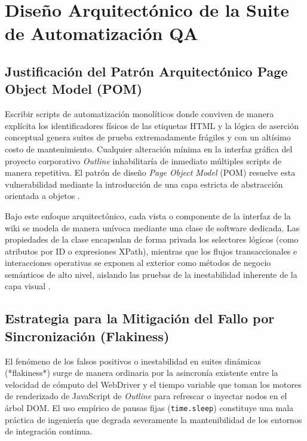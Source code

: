 \documentclass[12pt,oneside]{report}
\begin{document}
\chapter{Diseño Arquitectónico de la Suite de Automatización QA}

\section{Justificación del Patrón Arquitectónico Page Object Model (POM)}
Escribir scripts de automatización monolíticos donde conviven de manera explícita los identificadores físicos de las etiquetas HTML y la lógica de aserción conceptual genera suites de prueba extremadamente frágiles y con un altísimo costo de mantenimiento. Cualquier alteración mínima en la interfaz gráfica del proyecto corporativo \textit{Outline} inhabilitaría de inmediato múltiples scripts de manera repetitiva. El patrón de diseño \textit{Page Object Model} (POM) resuelve esta vulnerabilidad mediante la introducción de una capa estricta de abstracción orientada a objetos \parencite{jorgensen2022}.

Bajo este enfoque arquitectónico, cada vista o componente de la interfaz de la wiki se modela de manera unívoca mediante una clase de software dedicada. Las propiedades de la clase encapsulan de forma privada los selectores lógicos (como atributos por ID o expresiones XPath), mientras que los flujos transaccionales e interacciones operativas se exponen al exterior como métodos de negocio semánticos de alto nivel, aislando las pruebas de la inestabilidad inherente de la capa visual \parencite{pressman2014}.

\section{Estrategia para la Mitigación del Fallo por Sincronización (Flakiness)}
El fenómeno de los falsos positivos o inestabilidad en suites dinámicas (*flakiness*) surge de manera ordinaria por la asincronía existente entre la velocidad de cómputo del WebDriver y el tiempo variable que toman los motores de renderizado de JavaScript de \textit{Outline} para refrescar o inyectar nodos en el árbol DOM. El uso empírico de pausas fijas (\texttt{time.sleep}) constituye una mala práctica de ingeniería que degrada severamente la mantenibilidad de los entornos de integración continua.
\end{document}
